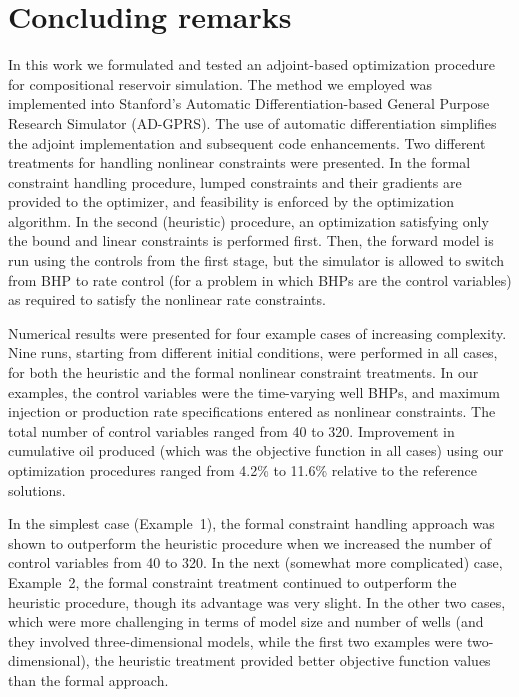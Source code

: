 \section{Concluding remarks}  \label{sec:conclusions}
In this work we formulated and tested an adjoint-based optimization procedure
for compositional reservoir simulation. The method we employed was implemented into
Stanford's Automatic Differentiation-based General Purpose Research Simulator
(AD-GPRS). The use of automatic differentiation simplifies the adjoint
implementation and subsequent code enhancements. Two different treatments for
handling nonlinear constraints were presented. In the formal constraint handling
procedure, lumped constraints and their gradients are provided to the optimizer,
and feasibility is enforced by the optimization algorithm. In the second
(heuristic) procedure, an optimization satisfying only the bound and linear
constraints is performed first. Then, the forward model is run using the
controls from the first stage, but the simulator is allowed to switch from BHP
to rate control (for a problem in which BHPs are the control variables) as
required to satisfy the nonlinear rate constraints.


Numerical results were presented for four example cases of increasing
complexity. Nine runs, starting from different initial conditions, were
performed in all cases, for both the heuristic and the formal nonlinear
constraint treatments. In our examples, the control variables were the time-varying well BHPs, and maximum injection or production rate specifications entered as nonlinear
constraints. The total number of control variables ranged from 40 to 320. Improvement in cumulative oil produced (which was the objective function in all cases) using our optimization procedures ranged from 4.2\% to 11.6\% relative to the reference solutions. 

In the simplest case (Example~1), the formal constraint handling approach was shown to outperform the heuristic procedure when we increased the number of control variables from 40 to 320. In the next (somewhat more complicated) case, Example~2, the formal constraint treatment continued to outperform the heuristic procedure, though its advantage was very slight. In the other two cases, which were more challenging in terms of model size and number of wells (and they involved three-dimensional models, while the first two examples were two-dimensional), the heuristic treatment provided better objective function values than the formal approach. 

